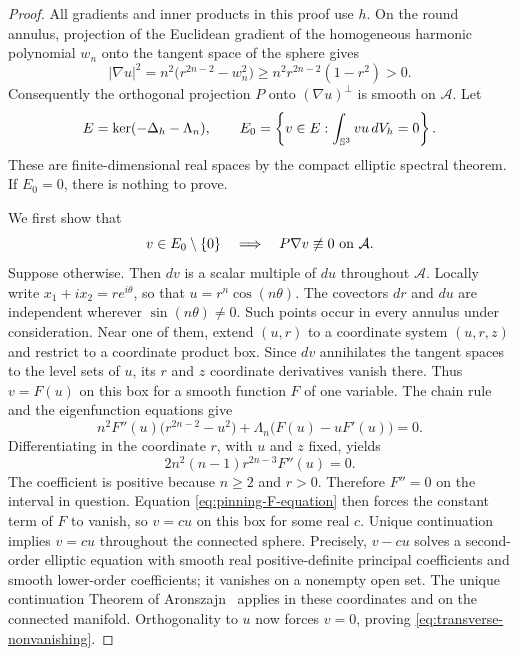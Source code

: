 \begin{proof}
All gradients and inner products in this proof use $h$.
On the round annulus, projection of the Euclidean gradient of the
homogeneous harmonic polynomial $w_n$ onto the tangent space of the
sphere gives
\begin{equation}\label{eq:pinning-gradient}
 |\nabla u|^2
 =n^2\bigl(r^{2n-2}-w_n^2\bigr)
 \ge n^2r^{2n-2}(1-r^2)>0.
\end{equation}
Consequently the orthogonal projection $P$ onto
$(\nabla u)^\perp$ is smooth on $\mathcal A$.
Let
\[
 E=\ker(-\Delta_h-\Lambda_n),\qquad
 E_0=\left\{v\in E:\int_{\mathbb S^3}vu\,dV_h=0\right\}.
\]
These are finite-dimensional real spaces by the compact elliptic
spectral theorem.  If $E_0=0$, there is nothing to prove.

We first show that
\begin{equation}\label{eq:transverse-nonvanishing}
 v\in E_0\setminus\{0\}\quad\Longrightarrow\quad
 P\nabla v\not\equiv0\ \hbox{on }\mathcal A.
\end{equation}
Suppose otherwise.  Then $dv$ is a scalar multiple of $du$ throughout
$\mathcal A$.  Locally write
$x_1+ix_2=re^{i\theta}$, so that $u=r^n\cos(n\theta)$.
The covectors $dr$ and $du$ are independent wherever
$\sin(n\theta)\ne0$.  Such points occur in every annulus under
consideration.  Near one of them, extend $(u,r)$ to a coordinate
system $(u,r,z)$ and restrict to a coordinate product box.  Since
$dv$ annihilates the tangent spaces to the level sets of $u$, its
$r$ and $z$ coordinate derivatives vanish there.  Thus $v=F(u)$ on
this box for a smooth function $F$ of one variable.
The chain rule and the eigenfunction equations give
\begin{equation}\label{eq:pinning-F-equation}
 n^2F''(u)\bigl(r^{2n-2}-u^2\bigr)
 +\Lambda_n\bigl(F(u)-uF'(u)\bigr)=0.
\end{equation}
Differentiating in the coordinate $r$, with $u$ and $z$ fixed, yields
\[
 2n^2(n-1)r^{2n-3}F''(u)=0.
\]
The coefficient is positive because $n\ge2$ and $r>0$.  Therefore
$F''=0$ on the interval in question.  Equation
\eqref{eq:pinning-F-equation} then forces the constant term of $F$
to vanish, so $v=cu$ on this box for some real $c$.
Unique continuation implies $v=cu$ throughout the connected sphere.
Precisely, $v-cu$ solves a second-order elliptic equation with smooth
real positive-definite principal coefficients and smooth lower-order
coefficients; it vanishes on a nonempty open set.  The unique
continuation Theorem of Aronszajn~\cite[pp.~235--236]{Aronszajn1957} applies in these
coordinates and on the connected manifold.  Orthogonality to $u$
now forces $v=0$, proving \eqref{eq:transverse-nonvanishing}.


\end{proof}
